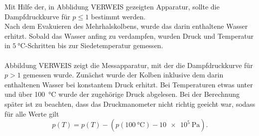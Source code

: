 Mit Hilfe der, in Abblidung VERWEIS
gezeigten Apparatur, sollte die Dampfdruckkurve für $p\leq 1$ bestimmt werden. \\
Nach dem Evakuieren des Mehrhalskolbens, wurde das darin enthaltene Wasser erhitzt. Sobald das Wasser anfing zu verdampfen, wurden Druck und Temperatur in $\SI{5}{\celsius}$-Schritten bis zur Siedetemperatur gemessen. \\
\ \\
Abbildung VERWEIS
zeigt die Messapparatur, mit der die Dampfdruckkurve für $p > 1$ gemessen wurde. Zunächst wurde der Kolben inklusive dem darin enthaltenen Wasser bei konstantem Druck erhitzt. Bei Temperaturen etwas unter und über \SI{100}{\celsius} wurde der zugehörige Druck abgelesen. Bei der Berechnung später ist zu beachten, dass das Druckmanometer nicht richtig geeicht war, sodass für alle Werte gilt
\begin{equation}
	p(T) = p(T) - (p(\SI{100}{\celsius})-\SI{10e+5}{\pascal}).
\end{equation}